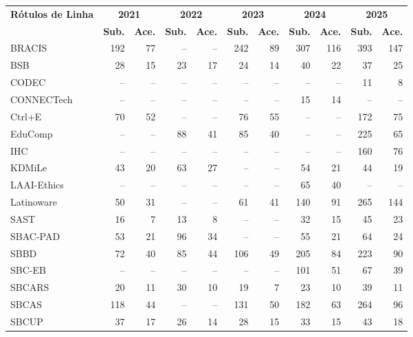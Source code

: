 \begin{table}[H]

\centering
\label{tab:submetidos-aceitos}
\tiny
\setlength{\tabcolsep}{2pt}
\renewcommand{\arraystretch}{1}
\begin{tabular}{|l|rr|rr|rr|rr|rr|}
\hline
\multirow{2}{*}{\textbf{Rótulos de Linha}} & \multicolumn{2}{c|}{\textbf{2021}} & \multicolumn{2}{c|}{\textbf{2022}} & \multicolumn{2}{c|}{\textbf{2023}} & \multicolumn{2}{c|}{\textbf{2024}} & \multicolumn{2}{c|}{\textbf{2025}} \\
\cline{2-11}
 & \textbf{Sub.} & \textbf{Ace.} & \textbf{Sub.} & \textbf{Ace.} & \textbf{Sub.} & \textbf{Ace.} & \textbf{Sub.} & \textbf{Ace.} & \textbf{Sub.} & \textbf{Ace.} \\
\hline
BRACIS & 192 & 77 & -- & -- & 242 & 89 & 307 & 116 & 393 & 147 \\ \hline
BSB & 28 & 15 & 23 & 17 & 24 & 14 & 40 & 22 & 37 & 25 \\ \hline
CODEC & -- & -- & -- & -- & -- & -- & -- & -- & 11 & 8 \\ \hline
CONNECTech & -- & -- & -- & -- & -- & -- & 15 & 14 & -- & -- \\ \hline
Ctrl+E & 70 & 52 & -- & -- & 76 & 55 & -- & -- & 172 & 75 \\ \hline
EduComp & -- & -- & 88 & 41 & 85 & 40 & -- & -- & 225 & 65 \\ \hline
IHC & -- & -- & -- & -- & -- & -- & -- & -- & 160 & 76 \\ \hline
KDMiLe & 43 & 20 & 63 & 27 & -- & -- & 54 & 21 & 44 & 19 \\ \hline
LAAI-Ethics & -- & -- & -- & -- & -- & -- & 65 & 40 & -- & -- \\ \hline
Latinoware & 50 & 31 & -- & -- & 61 & 41 & 140 & 91 & 265 & 144 \\ \hline
SAST & 16 & 7 & 13 & 8 & -- & -- & 32 & 15 & 45 & 23 \\ \hline
SBAC-PAD & 53 & 21 & 96 & 34 & -- & -- & 55 & 21 & 64 & 24 \\ \hline
SBBD & 72 & 40 & 85 & 44 & 106 & 49 & 205 & 84 & 223 & 90 \\ \hline
SBC-EB & -- & -- & -- & -- & -- & -- & 101 & 51 & 67 & 39 \\ \hline
SBCARS & 20 & 11 & 30 & 10 & 19 & 7 & 23 & 10 & 39 & 11 \\ \hline
SBCAS & 118 & 44 & -- & -- & 131 & 50 & 182 & 63 & 264 & 96 \\ \hline
SBCUP & 37 & 17 & 26 & 14 & 28 & 15 & 33 & 15 & 43 & 18 \\ \hline

\end{tabular}
\end{table}
